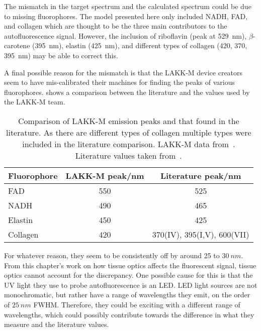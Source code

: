 The mismatch in the target spectrum and the calculated spectrum could be due to missing fluorophores. 
The model presented here only included NADH, FAD, and collagen which are thought to be the three main contributors to the autofluorescence signal.
However, the inclusion of riboflavin (peak at 529~nm), $\beta$-carotene (395~nm), elastin (425~nm), and different types of collagen (420, 370, 395~nm) may be able to correct this.

A final possible reason for the mismatch is that the LAKK-M device creators seem to have mis-calibrated their machines for finding the peaks of various fluorophores.
 shows a comparison between the literature and the values used by the LAKK-M team.

\begin{table}[!htbp]
  \centering

  \begin{tabular}{l|cc}

  \hline
  Fluorophore & LAKK-M peak/nm & Literature peak/nm \\
  \hline
   FAD  & 550& 525\\
   NADH  & 490& 465\\
   Elastin  & 450& 425\\
   Collagen  & 420 & 370(IV), 395(I,V), 600(VII)\\

  \hline

  \end{tabular}
  \caption{Comparison of LAKK-M emission peaks and that found in the literature. As there are different types of collagen multiple types were included in the literature comparison. LAKK-M data from~\cite{palmer2016changes,dunaev2015individual,smirnova2012collagen,palmer2016development}. Literature values taken from~\cite{dacosta2003molecular,pan2015detection,islam2013ph,patterson2000separation}.}
  \label{tab:flurocompvalues}

\end{table}

For whatever reason, they seem to be consistently off by around 25 to $30~nm$.
From this chapter's work on how tissue optics affects the fluorescent signal, tissue optics cannot account for the discrepancy.
One possible cause for this is that the UV light they use to probe autofluorescence is an LED\@.
LED light sources are not monochromatic, but rather have a range of wavelengths they emit, on the order of $25~nm$ FWHM\@.
Therefore, they could be exciting with a different range of wavelengths, which could possibly contribute towards the difference in what they measure and the literature values.

